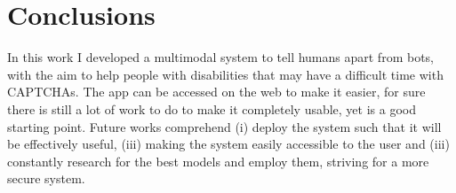 \section{Conclusions}
In this work I developed a multimodal system to tell humans apart from bots, with the aim to help people with disabilities that may have a difficult time with CAPTCHAs.
The app can be accessed on the web to make it easier, for sure there is still a lot of work to do to make it completely usable, yet is a good starting point.
Future works comprehend (i) deploy the system such that it will be effectively useful, (iii) making the system easily accessible to the user and (iii) constantly research for the best models and employ them, striving for a more secure system.